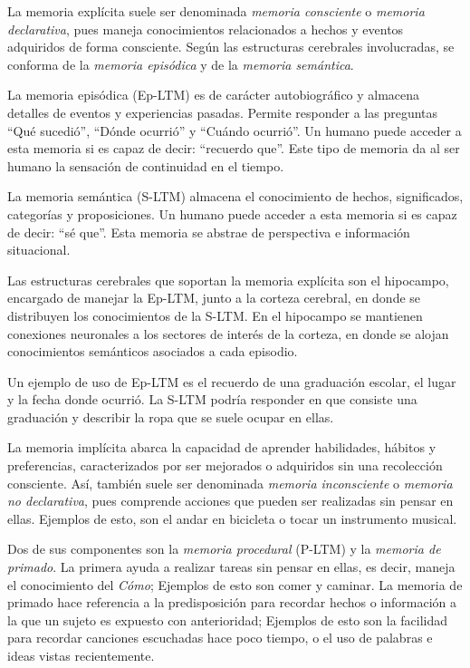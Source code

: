 La memoria explícita suele ser denominada \textit{memoria consciente} o \textit{memoria declarativa}, pues maneja conocimientos relacionados a hechos y eventos adquiridos de forma consciente. Según las estructuras cerebrales involucradas, se conforma de la \textit{memoria episódica} y de la \textit{memoria semántica}.

La memoria episódica (Ep-LTM) es de carácter  autobiográfico y almacena detalles de eventos y experiencias pasadas. Permite responder a las preguntas ``Qué sucedió'', ``Dónde ocurrió'' y ``Cuándo ocurrió''. Un humano puede acceder a esta memoria si es capaz de decir: ``recuerdo que''. Este tipo de memoria da al ser humano la sensación de continuidad en el tiempo.

La memoria semántica (S-LTM) almacena el conocimiento de hechos, significados, categorías y proposiciones. Un humano puede acceder a esta memoria si es capaz de decir: ``sé que''. Esta memoria se abstrae de perspectiva e información situacional.

Las estructuras cerebrales que soportan la memoria explícita son el hipocampo, encargado de manejar la Ep-LTM, junto a la corteza cerebral, en donde se distribuyen los conocimientos de la S-LTM. En el hipocampo se mantienen conexiones neuronales a los sectores de interés de la corteza, en donde se alojan conocimientos semánticos asociados a cada episodio.

Un ejemplo de uso de Ep-LTM es el recuerdo de una graduación escolar, el lugar y la fecha donde ocurrió. La S-LTM podría responder en que consiste una graduación y describir la ropa que se suele ocupar en ellas.



La memoria implícita  abarca la capacidad de aprender habilidades, hábitos y preferencias, caracterizados por ser mejorados o adquiridos sin una recolección consciente. Así, también suele ser denominada \textit{memoria inconsciente} o \textit{memoria no declarativa}, pues comprende acciones que pueden ser realizadas sin pensar en ellas. Ejemplos de esto, son el andar en bicicleta o tocar un instrumento musical.

Dos de sus componentes son la \textit{memoria procedural} (P-LTM) y la \textit{memoria de primado}. La primera ayuda a realizar tareas sin pensar en ellas, es decir, maneja el conocimiento del \textit{Cómo}; Ejemplos de esto son comer y caminar. La memoria de primado hace referencia a la predisposición para recordar hechos o información a la que un sujeto es expuesto con anterioridad; Ejemplos de esto son la facilidad para recordar canciones escuchadas hace poco tiempo, o el uso de palabras e ideas vistas recientemente.

